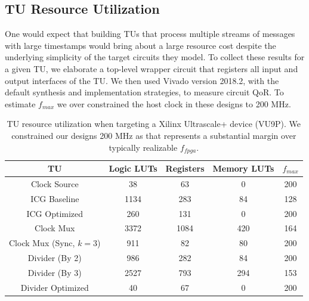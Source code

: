 
\subsection{TU Resource Utilization}
One would expect that building TUs that process multiple streams of messages
with large timestamps would bring about a large resource cost despite the
underlying simplicity of the target circuits they model. To collect these results for a given TU,
we elaborate a top-level wrapper circuit that registers all input and output
interfaces of the TU. We then used Vivado version 2018.2, with the default
synthesis and implementation strategies, to measure circuit QoR. To estimate
$f_{max}$ we over constrained the host clock in these designs to 200 MHz.

\begin{table}[t]
\centering
    \begin{tabular}{c c c c c}
        TU & Logic LUTs & Registers & Memory LUTs & $f_{max}$ \\
    \hline
        Clock Source & 38 & 63 & 0& 200 \\
        \hline
        ICG Baseline  & 1134 & 283 & 84& 128 \\
        ICG Optimized & 260 & 131 & 0& 200 \\
        \hline
        Clock Mux & 3372 & 1084 & 420& 164 \\
        Clock Mux (Sync, $k=3$) & 911 & 82 & 80& 200 \\
        \hline
        Divider (By 2) & 986 & 282 & 84& 200 \\
        Divider (By 3) & 2527 & 793 & 294& 153 \\
        Divider Optimized & 40 & 67 & 0& 200 \\
    \hline
    \end{tabular}
    \caption{TU resource utilization when targeting a Xilinx Ultrascale+ device (VU9P). We constrained our designs 200 MHz as that
    represents a substantial margin over typically realizable $f_{fpga}$.}
    \label{tbl:pdes-tu-utilization}
\end{table}

